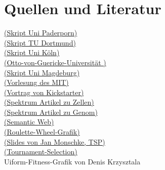 \section{Quellen und Literatur}

\href{http://www2.cs.uni-paderborn.de/cs/ag-klbue/de/courses/ws04/ea/students/ga_report.pdf}{(Skript Uni Paderporn)}\\
\href{http://www.mathematik.tu-dortmund.de/papers/MehmetiAmreinKulmsMacinLoenserBogonosWaidhas2014.pdf}{(Skript TU Dortmund)}\\
\href{http://www.spinfo.phil-fak.uni-koeln.de/fileadmin/spinfo/ki10/Genetische_algorithmen.pdf}{(Skript Uni Köln)}\\
\href{http://www.borgelt.net/slides/ga.pdf}{(Otto-von-Guericke-Universität )}\\
\href{http://www-e.uni-magdeburg.de/harbich/genetische_algorithmen/genetische_algorithmen.pdf}{(Skript Uni Magdeburg)}\\
\href{https://www.youtube.com/watch?v=kHyNqSnzP8Y}{(Vorlesung des MIT)}\\
\href{https://www.youtube.com/watch?v=6l6b78Y4V7Y}{(Vortrag von Kickstarter)}\\
\href{http://www.spektrum.de/lexikon/neurowissenschaft/zelle/14161}{(Spektrum Artikel zu Zellen)}\\
\href{http://www.spektrum.de/lexikon/biologie/genom/27365}{(Spektrum Artikel zu Genom)}\\
\href{http://semantic-web-grundlagen.de/w/images/e/e9/IntroAI-V06.pdf}{(Semantic Web)}\\
\href{http://comcute.eti.pg.gda.pl/wp-content/uploads/2012/12/image_9_5.png}{(Roulette-Wheel-Grafik)}\\
\href{http://janmonschke.com/Genetic-Algorithms/presentation/#/}{(Slides von Jan Monschke, TSP)}\\
\href{https://en.wikipedia.org/wiki/Tournament_selection}{(Tournament-Selection)}\\
Uiform-Fitness-Grafik von Denis Krzysztala\\
